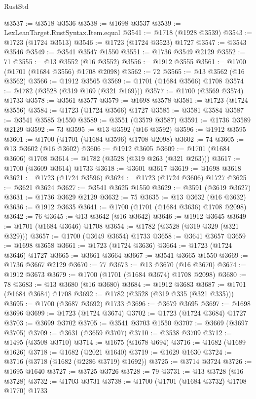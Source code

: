 \begin{lexlean}{RustStd}
\begin{coremodule}
@3537 := @3518 @3536
@3538 := @1698 @3537
@3539 := LexLeanTarget.RustSyntax.Item.equal
@3541 := @1718 (@1928 @3539)
@3543 := @1723 (@1724 @3513)
@3546 := @1723 (@1724 @3523) @1727
@3547 := @3543 @3546
@3549 := @3541 @3547 @1550
@3551 := @1736 @3549 @2129
@3552 := 71
@3555 := @13 @3552 (@16 @3552)
@3556 := @1912 @3555
@3561 := @1700 (@1701 (@1684 @3556) @1708 @2098)
@3562 := 72
@3565 := @13 @3562 (@16 @3562)
@3566 := @1912 @3565
@3569 := @1701 (@1684 @3566) @1708
@3574 := @1782 (@3528 (@319 @169 (@321 @169)))
@3577 := @1700 (@3569 @3574) @1733
@3578 := @3561 @3577
@3579 := @1698 @3578
@3581 := @1723 (@1724 @3556)
@3584 := @1723 (@1724 @3566) @1727
@3585 := @3581 @3584
@3587 := @3541 @3585 @1550
@3589 := @3551 (@3579 @3587)
@3591 := @1736 @3589 @2129
@3592 := 73
@3595 := @13 @3592 (@16 @3592)
@3596 := @1912 @3595
@3601 := @1700 (@1701 (@1684 @3596) @1708 @2098)
@3602 := 74
@3605 := @13 @3602 (@16 @3602)
@3606 := @1912 @3605
@3609 := @1701 (@1684 @3606) @1708
@3614 := @1782 (@3528 (@319 @263 (@321 @263)))
@3617 := @1700 (@3609 @3614) @1733
@3618 := @3601 @3617
@3619 := @1698 @3618
@3621 := @1723 (@1724 @3596)
@3624 := @1723 (@1724 @3606) @1727
@3625 := @3621 @3624
@3627 := @3541 @3625 @1550
@3629 := @3591 (@3619 @3627)
@3631 := @1736 @3629 @2129
@3632 := 75
@3635 := @13 @3632 (@16 @3632)
@3636 := @1912 @3635
@3641 := @1700 (@1701 (@1684 @3636) @1708 @2098)
@3642 := 76
@3645 := @13 @3642 (@16 @3642)
@3646 := @1912 @3645
@3649 := @1701 (@1684 @3646) @1708
@3654 := @1782 (@3528 (@319 @329 (@321 @329)))
@3657 := @1700 (@3649 @3654) @1733
@3658 := @3641 @3657
@3659 := @1698 @3658
@3661 := @1723 (@1724 @3636)
@3664 := @1723 (@1724 @3646) @1727
@3665 := @3661 @3664
@3667 := @3541 @3665 @1550
@3669 := @1736 @3667 @2129
@3670 := 77
@3673 := @13 @3670 (@16 @3670)
@3674 := @1912 @3673
@3679 := @1700 (@1701 (@1684 @3674) @1708 @2098)
@3680 := 78
@3683 := @13 @3680 (@16 @3680)
@3684 := @1912 @3683
@3687 := @1701 (@1684 @3684) @1708
@3692 := @1782 (@3528 (@319 @335 (@321 @335)))
@3695 := @1700 (@3687 @3692) @1733
@3696 := @3679 @3695
@3697 := @1698 @3696
@3699 := @1723 (@1724 @3674)
@3702 := @1723 (@1724 @3684) @1727
@3703 := @3699 @3702
@3705 := @3541 @3703 @1550
@3707 := @3669 (@3697 @3705)
@3709 := @3631 (@3659 @3707)
@3710 := @3538 @3709
@3712 := @1495 (@3508 @3710)
@3714 := @1675 (@1678 @694)
@3716 := @1682 (@1689 @1626)
@3718 := @1682 (@2021 @1640)
@3719 := @1629 @1630
@3724 := @3716 (@3718 (@1682 (@2286 @3719) @1692))
@3725 := @3714 @3724
@3726 := @1695 @1640
@3727 := @3725 @3726
@3728 := 79
@3731 := @13 @3728 (@16 @3728)
@3732 := @1703 @3731
@3738 := @1700 (@1701 (@1684 @3732) @1708 @1770) @1733

\end{coremodule}
\end{lexlean}
